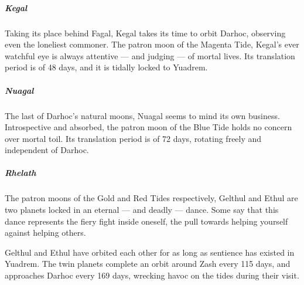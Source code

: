 \subparagraph{Kegal} Taking its place behind Fagal, Kegal takes its time to orbit Darhoc, observing even the loneliest commoner.
The patron moon of the Magenta Tide, Kegal's ever watchful eye is always attentive --- and judging --- of mortal lives.
Its translation period is of 48 days, and it is tidally locked to Yuadrem.

\subparagraph{Nuagal} The last of Darhoc's natural moons, Nuagal seems to mind its own business.
Introspective and absorbed, the patron moon of the Blue Tide holds no concern over mortal toil.
Its translation period is of 72 days, rotating freely and independent of Darhoc.

\subparagraph{Rhelath} The patron moons of the Gold and Red Tides respectively, Gelthul and Ethul are two planets locked in an eternal --- and deadly --- dance.
Some say that this dance represents the fiery fight inside oneself, the pull towards helping yourself against helping others.

Gelthul and Ethul have orbited each other for as long as sentience has existed in Yuadrem.%
The twin planets complete an orbit around Zash every 115 days, and approaches Darhoc every 169 days, wrecking havoc on the tides during their visit.
